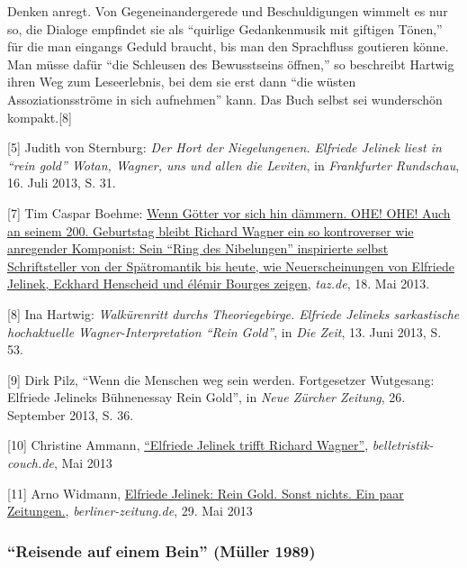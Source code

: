 \documentclass[fontsize=12pt]{scrartcl}
\begin{document}
Denken anregt. Von Gegen\-ein\-an\-der\-ge\-rede und Beschuldigungen wimmelt es nur so, die Dialoge empfindet sie als "`quirlige Gedankenmusik mit giftigen T\"onen,"' f\"ur die man eingangs Geduld braucht, bis man den Sprachfluss goutieren k\"onne. Man m\"usse daf\"ur "`die Schleusen des Bewusstseins \"offnen,"' so beschreibt Hartwig ihren Weg zum Leseerlebnis, bei dem sie erst dann "`die w\"usten Assoziationsstr\"ome in sich aufnehmen"' kann. Das Buch \mbox{selbst} sei wundersch\"on kompakt.[8]

{\tiny[5] Judith von Sternburg: \textit{Der Hort der Niegelungenen. Elfriede Jelinek liest in "`rein gold"' Wotan, Wagner, uns und allen die Leviten}, in \textit{Frankfurter Rundschau}, 16. Juli 2013, S. 31.\par}
{\tiny[7] Tim Caspar Boehme: \href{http://www.taz.de/1/archiv/digitaz/artikel/?ressort=ku\&dig=2013/05/18/a0031}{Wenn G\"otter vor sich hin d\"ammern. OHE! OHE! Auch an seinem 200. Geburtstag bleibt Richard Wagner ein so kontroverser wie anregender Komponist: Sein "`Ring des Nibelungen"' inspirierte \mbox{selbst} Schriftsteller von der Sp\"atromantik bis heute, wie Neuerscheinungen von Elfriede Jelinek, Eckhard Henscheid und \'{e}l\'{e}mir Bourges zeigen}, \textit{taz.de}, 18. Mai 2013.\par}
{\tiny[8] Ina Hartwig: \textit{Walk\"urenritt durchs Theoriegebirge. Elfriede Jelineks sarkastische hochaktuelle Wagner-Interpretation "`Rein Gold"'}, in \textit{Die Zeit}, 13. Juni 2013, S. 53.\par}
{\tiny[9] Dirk Pilz, "`Wenn die Menschen weg sein werden. Fortgesetzer Wutgesang: Elfriede Jelineks B\"uhnenessay Rein Gold"', in \textit{Neue Z\"urcher Zeitung}, 26. September 2013, S. 36.\par}
{\tiny[10] Christine Ammann, \href{http://www.belletristik-couch.de/elfriede-jelinek-rein-gold.html}{"`Elfriede Jelinek trifft Richard Wagner"'}, \textit{belletristik-couch.de}, Mai 2013\par}
{\tiny[11] Arno Widmann, \href{http://www.berliner-zeitung.de/vom-nachttisch-geraeumt/elfriede-jelinek--rein-gold--sonst-nichts--ein-paar-zeitungen-,22893728,22894736.html}{Elfriede Jelinek: Rein Gold. Sonst nichts. Ein paar Zeitungen.}, \textit{berliner-zeitung.de}, 29. Mai 2013\par}

\newpage
\subsubsection{"`Reisende auf einem Bein"' (M\"uller 1989)}
\label{subsubsec:6.1.10}
\end{document}
